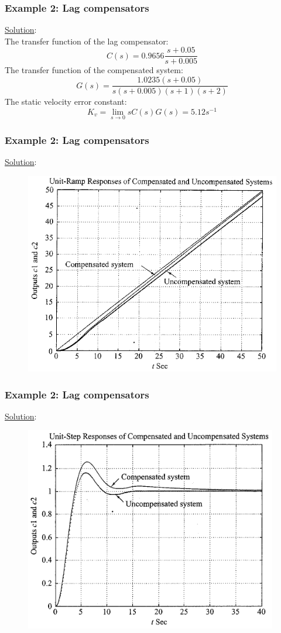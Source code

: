 \begin{frame}
	\frametitle{Example 2: Lag compensators}
	\underline{Solution}:\\
	The transfer function of the lag compensator: 
	$$C(s)=0.9656\frac{s+0.05}{s+0.005}$$
	The transfer function of the compensated system:
	$$G(s)=\frac{1.0235(s+0.05)}{s(s+0.005)(s+1)(s+2)}$$
	The static velocity error constant:
	$$K_v=\lim_{s\to 0}sC(s)G(s)=5.12s^{-1}$$
\end{frame}

\begin{frame}
	\frametitle{Example 2: Lag compensators}
	\underline{Solution}:
	\begin{figure}
		\centering
		\includegraphics[width=0.65\linewidth]{Ex2_ramp}
	\end{figure}
\end{frame}

\begin{frame}
	\frametitle{Example 2: Lag compensators}
	\underline{Solution}:
	\begin{figure}
		\centering
		\includegraphics[width=0.65\linewidth]{Ex2_response}
	\end{figure}
\end{frame}

